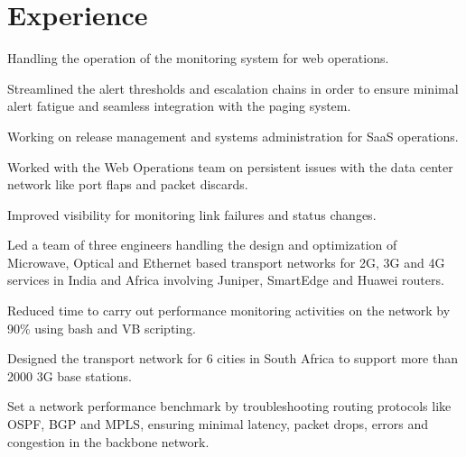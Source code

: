 \documentclass[]{deedy-resume-openfont}
\begin{document}
\hfill
\begin{minipage}[t]{0.66\textwidth} 


\section{Experience}

\vspace{\topsep} %
\begin{tightemize}\item Handling the operation of the monitoring system for web operations.
\item Streamlined the alert thresholds and escalation chains in order to ensure minimal alert fatigue and seamless
integration with the paging system.
\item Working on release management and systems administration for SaaS operations.
\end{tightemize}
\sectionsep

\begin{tightemize}
\item Worked with the Web Operations team on persistent issues with the data center network like port flaps and packet discards.\item Improved visibility for monitoring link failures and status changes.\end{tightemize}
\sectionsep

\begin{tightemize}
\item Led a team of three engineers handling the design and optimization of Microwave, Optical and Ethernet based transport networks for 2G, 3G and 4G services in India and Africa involving Juniper, SmartEdge and Huawei routers.\item Reduced time to carry out performance monitoring activities on the network by 90\% using bash and VB scripting. \item Designed the transport network for 6 cities in South Africa to support more than 2000 3G base stations. \item Set a network performance benchmark by troubleshooting routing protocols like OSPF, BGP and MPLS, ensuring minimal latency, packet drops, errors and congestion in the backbone network. \end{tightemize}
\sectionsep


\end{minipage}
\end{document}
